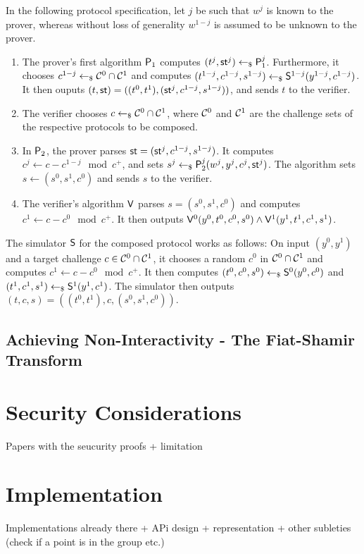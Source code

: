 \documentclass[runningheads]{llncs}
\begin{document}
  In the following protocol specification, let $j$ be such that $w^j$ is known to the prover, whereas without loss of generality $w^{1-j}$ is assumed to be unknown to the prover.
  \begin{enumerate}
    \item
      The prover's first algorithm $\mathsf{P}_1$ computes $(t^j,\mathsf{st}^j)\gets_{\$}\mathsf{P}_1^j$.
      Furthermore, it chooses $c^{1-j}\gets_{\$}\mathcal{C}^0\cap\mathcal{C}^1$ and computes $(t^{1-j},c^{1-j},s^{1-j})\gets_{\$}\mathsf{S}^{1-j}(y^{1-j},c^{1-j})$.
      It then ouputs $(t,\mathsf{st}) = ((t^0,t^1),(\mathsf{st}^j,c^{1-j},s^{1-j}))$, and sends $t$ to the verifier.
    \item
      The verifier chooses $c\gets_{\$}\mathcal{C}^0\cap\mathcal{C}^1$, where $\mathcal{C}^0$ and $\mathcal{C}^1$ are the challenge sets of the respective protocols to be composed.
    \item
      In $\mathsf{P}_2$, the prover parses $\mathsf{st}=(\mathsf{st}^j,c^{1-j},s^{1-j})$.
      It computes $c^j\gets c-c^{1-j}\mod c^+$, and sets $s^j\gets_{\$}\mathsf{P}_2^j(w^j,y^j,c^j,\mathsf{st}^j)$.
      The algorithm sets $s\gets(s^0,s^1,c^0)$ and sends $s$ to the verifier.
    \item
      The verifier's algorithm $\mathsf{V}$ parses $s=(s^0,s^1,c^0)$ and computes $c^1\gets c-c^0\mod c^+$.
      It then outputs $\mathsf{V}^0(y^0,t^0,c^0,s^0)\land\mathsf{V}^1(y^1,t^1,c^1,s^1)$. 
  \end{enumerate}

  The simulator $\mathsf{S}$ for the composed protocol works as follows:
  On input $(y^0,y^1)$ and a target challenge $c\in\mathcal{C}^0\cap\mathcal{C}^1$, it chooses a random $c^0$ in $\mathcal{C}^0\cap\mathcal{C}^1$ and computes $c^1\gets c-c^0 \mod c^+$.
  It then computes $(t^0,c^0,s^0)\gets_{\$}\mathsf{S}^0(y^0,c^0)$ and $(t^1,c^1,s^1)\gets_{\$}\mathsf{S}^1(y^1,c^1)$.
  The simulator then outputs $(t,c,s)=((t^0,t^1),c,(s^0,s^1,c^0))$.

\subsection{Achieving Non-Interactivity - The Fiat-Shamir Transform}


\section{Security Considerations}

Papers with the seucurity proofs + limitation

\section{Implementation}
Implementations already there + APi design + representation + other subleties (check if a point is in the group etc.)
\end{document}
